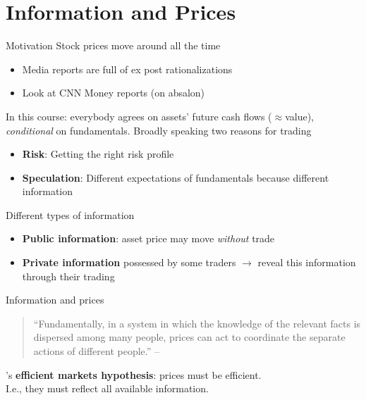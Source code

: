 \documentclass[english,10pt]{beamer}
\begin{document}
\section{Information and Prices}

\begin{frame}{Motivation}
	Stock prices move around all the time
	\begin{itemize}
		\item Media reports are full of ex post rationalizations 
		\item Look at CNN Money reports (on absalon)
	\end{itemize}
	In this course: everybody agrees on assets' future cash flows ($\approx$value), \textit{conditional} on fundamentals. Broadly speaking two reasons for trading
	\begin{itemize}
		\item \textbf{Risk}: Getting the right risk profile
		\item \textbf{Speculation}: Different expectations of fundamentals because different information
	\end{itemize}
	Different types of information
	\begin{itemize}
		\item \textbf{Public information}:  asset price may move \textit{without} trade
		\item \textbf{Private information} possessed by some traders  $\rightarrow$ reveal this information through their trading
	\end{itemize}
\end{frame}


\begin{frame}{Information and prices}
	\begin{quotation}
		``Fundamentally, in a system in which the knowledge of the relevant facts is dispersed among many people, prices can act to coordinate the separate actions of different people.'' -- 
	\end{quotation}

	's \textbf{efficient markets hypothesis}: {prices} must be {efficient}.
	\\
	I.e., they must reflect all available information.
\end{frame}


%	
\end{document}
